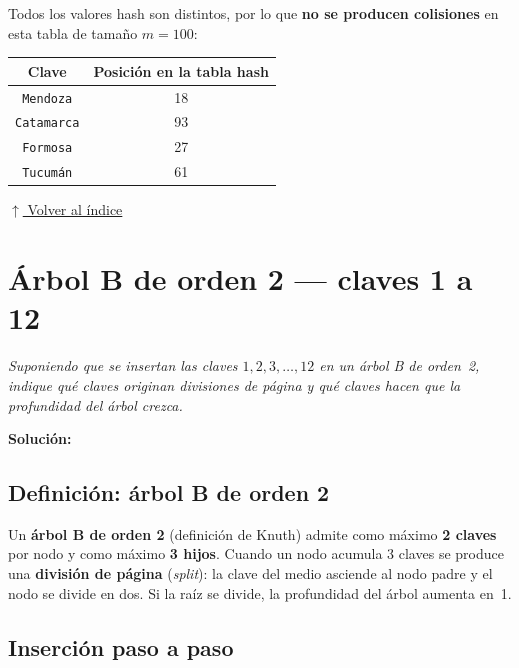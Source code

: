 \documentclass[12pt]{article}
\newcommand{\solucion}{%
    \vspace{0.8em}\textbf{Solución:}\par\vspace{0.4em}%
}
\newcommand{\volverindice}{%
    \vspace{1em}%
    \begin{flushright}%
        \hyperlink{indice}{\small $\uparrow$ Volver al índice}%
    \end{flushright}%
}
\begin{document}
Todos los valores hash son distintos, por lo que \textbf{no se producen colisiones}
en esta tabla de tamaño $m = 100$:

\begin{center}
\begin{tabular}{cc}
\toprule
\textbf{Clave} & \textbf{Posición en la tabla hash} \\
\midrule
\texttt{Mendoza}   & 18 \\
\texttt{Catamarca} & 93 \\
\texttt{Formosa}   & 27 \\
\texttt{Tucum\'an} & 61 \\
\bottomrule
\end{tabular}
\end{center}

\volverindice

\newpage
\section{Árbol B de orden 2 --- claves 1 a 12}

\textit{Suponiendo que se insertan las claves $1, 2, 3, \ldots, 12$ en un árbol B
de orden~2, indique qué claves originan divisiones de página y qué claves hacen
que la profundidad del árbol crezca.}

\solucion

\subsection*{Definición: árbol B de orden 2}

Un \textbf{árbol B de orden 2} (definición de Knuth) admite como máximo
\textbf{2 claves} por nodo y como máximo \textbf{3 hijos}.
Cuando un nodo acumula 3 claves se produce una \textbf{división de página}
(\textit{split}): la clave del medio asciende al nodo padre y el nodo se
divide en dos. Si la raíz se divide, la profundidad del árbol aumenta en~1.

\subsection*{Inserción paso a paso}
\end{document}
